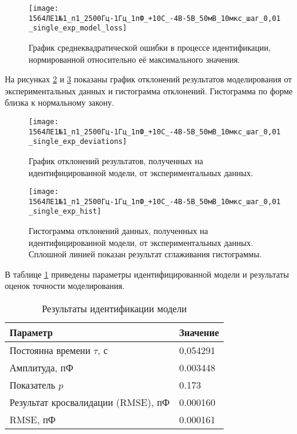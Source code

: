 	\begin{figure}[!htp]
		\centering
		\texttt{[image: 1564ЛЕ1№1\_п1\_2500Гц-1Гц\_1пФ\_+10С\_-4В-5В\_50мВ\_10мкс\_шаг\_0,01\_single\_exp\_model\_loss]}
		\caption{График среднеквадратической ошибки в процессе идентификации,
		         нормированной относительно её максимального значения.}
		\label{pic:loss_single_exp_283}
	\end{figure}

	На рисунках \ref{pic:deviations_single_exp_283} и \ref{pic:hist_single_exp_283}
	показаны график отклонений результатов моделирования от экспериментальных
	данных и гистограмма отклонений. Гистограмма по форме близка к нормальному
	закону.

	\begin{figure}[!htp]
		\centering
		\texttt{[image: 1564ЛЕ1№1\_п1\_2500Гц-1Гц\_1пФ\_+10С\_-4В-5В\_50мВ\_10мкс\_шаг\_0,01\_single\_exp\_deviations]}
		\caption{График отклонений результатов, полученных на идентифицированной
		модели, от экспериментальных данных.}
		\label{pic:deviations_single_exp_283}
	\end{figure}

	\begin{figure}[!htp]
		\centering
		\texttt{[image: 1564ЛЕ1№1\_п1\_2500Гц-1Гц\_1пФ\_+10С\_-4В-5В\_50мВ\_10мкс\_шаг\_0,01\_single\_exp\_hist]}
		\caption{Гистограмма отклонений данных, полученных на идентифицированной 
		         модели, от экспериментальных данных. Сплошной линией показан
		         результат сглаживания гистограммы.}
		\label{pic:hist_single_exp_283}
	\end{figure}

	В таблице \ref{table:results_single_exp_ideal_283} приведены параметры 
	идентифицированной модели и результаты оценок точности моделирования.

	\begin{table}[!htp]
		\centering
		\caption{Результаты идентификации модели}
		\begin{tabular}{|l|l|}
			\hline
			Параметр                           & Значение \\ \hline
			Постоянна времени $\tau$, с        & 0,054291 \\ \hline
			Амплитуда, пФ                      & 0.003448 \\ \hline
			Показатель $p$                     & 0.173    \\ \hline
			Результат кросвалидации (RMSE), пФ & 0.000160 \\ \hline
			RMSE, пФ                           & 0.000161 \\ \hline
		\end{tabular}
		\label{table:results_single_exp_ideal_283}
	\end{table}

